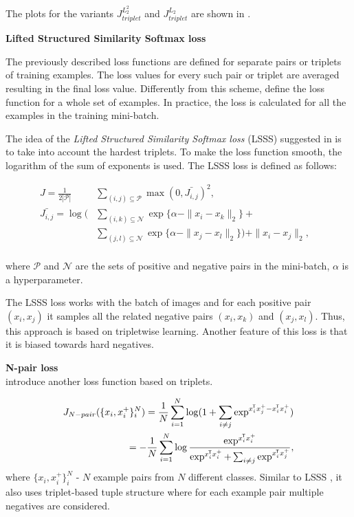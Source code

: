 The plots for the variants $J_{triplet}^{L_2^2}$  and $J_{triplet}^{L_2}$  are shown in .

\bigskip\indent\textbf{Lifted Structured Similarity Softmax loss}

The previously described loss functions are defined for separate pairs or triplets of training examples. The loss values for every such pair or triplet are averaged resulting in the final loss value. Differently from this scheme, \citep{Song16} define the loss function for a whole set of examples. In practice, the loss is calculated for all the examples in the training mini-batch. 

The idea of the \textit{Lifted Structured Similarity Softmax loss} (LSSS) suggested in \citep{Song16} is to take into account the hardest triplets. To make the loss function smooth, the logarithm of the sum of exponents is used. The LSSS loss is defined as follows: 

\begin{equation}
  \begin{aligned}
  \label{eq:lifted}
   J  = \tfrac{1}{2 \left| \mathcal{P} \right|} & \sum_{(i,j) \subseteq \mathcal{P}}  \max(0, \bar{J_{i,j}})^{2}, & \\
    \bar{J_{i,j}}  = \log(& \sum_{(i,k)\subseteq \mathcal{N}} \exp\{\alpha - \|x_i - x_k \|_2\} + &\\
   & \sum_{(j, l)\subseteq  \mathcal{N}}\exp\{\alpha -\|x_j - x_l \|_2\})  + \|x_i - x_j \|_2, & \\
  \end{aligned}
\end{equation}


where $\mathcal{P}$ and $\mathcal{N}$ are the sets of positive and negative pairs in the mini-batch, $\alpha$ is a hyperparameter.

The LSSS loss works with the batch of images and for each positive pair $(x_i, x_j)$ it samples all the related negative pairs $(x_i, x_k)$ and $(x_j, x_l)$. Thus, this approach is based on tripletwise learning. Another feature of this loss is that it is biased towards hard negatives.

\bigskip\indent\textbf{N-pair loss}\\
\citep{sohn2016improved} introduce another loss function based on triplets. 

\begin{equation}
 \label{eq:npair}
 \begin{aligned}
    J_{N-pair}(\{x_i, x_i^+\}_i^N) = \frac1  N \sum_{i=1}^N  \log (1 + \sum_{i \neq j} \exp^{x_i^{\mkern-1.5mu\mathsf{T}} x_j^+ -x_i^{\mkern-1.5mu\mathsf{T}} x_i^+ })\\ = - \frac1  N \sum_{i=1}^N \log \frac {\exp^{x_i^{\mkern-1.5mu\mathsf{T}} x_i^+}}{\exp^{x_i^{\mkern-1.5mu\mathsf{T}} x_i^+} + \sum_{i \neq j} \exp^{x_i^{\mkern-1.5mu\mathsf{T}} x_j^+}}, 
\end{aligned}
\end{equation}
where $\{x_i, x_i^+\}_i^N$ - $N$ example pairs from $N$ different classes.
Similar to LSSS , it also uses triplet-based tuple structure where for each example pair multiple negatives are considered.



